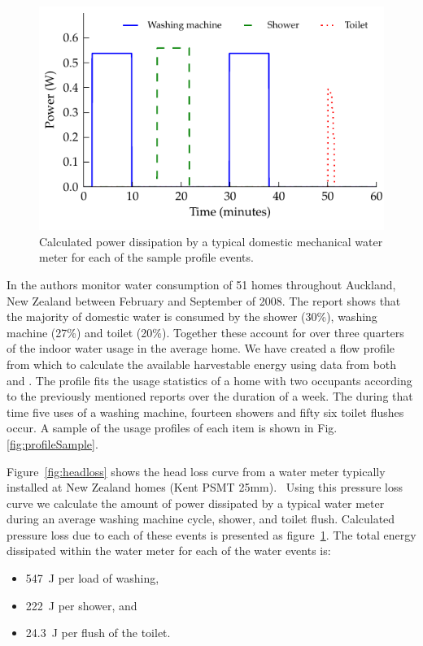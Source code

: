 \documentclass[10pt,final,journal]{IEEEtran}
\begin{document}
    \begin{figure}
        \begin{center}
        \includegraphics[width=\linewidth]{graph_harvest}
        \end{center}
        \caption{Calculated power dissipation by a typical domestic mechanical water meter for each of the sample profile events.}
        \label{fig:powerDissipated_meter}
    \end{figure}


    In \cite{Heinrich2008} the authors monitor water consumption of 51 homes throughout Auckland, New Zealand between February and September of 2008.
    The report shows that the majority of domestic water is consumed by the shower (30\%), washing machine (27\%) and toilet (20\%).
    Together these account for over three quarters of the indoor water usage in the average home.
    We have created a flow profile from which to calculate the available harvestable energy using data from both \cite{Heinrich2008} and \cite{Heinrich2007}.
    The profile fits the usage statistics of a home with two occupants according to the previously mentioned reports over the duration of a week.
    The during that time five uses of a washing machine, fourteen showers and fifty six toilet flushes occur.
    A sample of the usage profiles of each item is shown in Fig. \ref{fig:profileSample}.

    Figure~\ref{fig:headloss} shows the head loss curve from a water meter typically installed at New Zealand homes (Kent PSMT 25mm).~\cite{WatercareNewZealand2014}
    Using this pressure loss curve we calculate the amount of power dissipated by a typical water meter during an average washing machine cycle, shower, and toilet flush.
    Calculated pressure loss due to each of these events is presented as figure~\ref{fig:powerDissipated_meter}.
    The total energy dissipated within the water meter for each of the water events is:
    \begin{itemize}
    \item \SI{547}{\joule} per load of washing,
    \item \SI{222}{\joule} per shower, and
    \item \SI{24.3}{\joule} per flush of the toilet.
    \end{itemize}
\end{document}
